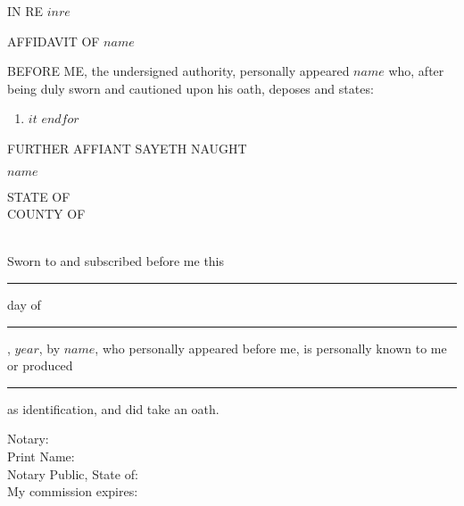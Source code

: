 \documentclass{article}
\def\name{{$name$\xspace}}
\begin{document}
\thispagestyle{empty}

\parbox{2in}{
  \MakeUppercase{In re $inre$}
  }

\begin{center}
  \MakeUppercase{\large Affidavit of \MakeUppercase{\name}}
\end{center}

\MakeUppercase{Before me}, the undersigned authority, personally appeared \MakeUppercase{\name} who, after being duly sworn and cautioned upon his oath, deposes and states:

\begin{enumerate}
  $for(statements)$
  \item $it$
  $endfor$
\end{enumerate}

\MakeUppercase{further affiant sayeth naught}\\

\begin{flushright}
\parbox{3in} {
  \hrulefill
  \vspace{-2ex}
  \begin{center}
    \MakeUppercase{\name}
  \end{center}
}
\end{flushright}

\parbox{2in} {
  \MakeUppercase{state of}\quad\hrulefill\\
  \MakeUppercase{county of}\quad\hrulefill
}

~\\

Sworn to and subscribed before me this \rule{0.25in}{0.4pt} day of \rule{0.5in}{0.4pt}, $year$, by \MakeUppercase{\name}, who personally appeared before me, is personally known to me or produced \rule{2in}{0.4pt} as identification, and did take an oath.

\vfill

\begin{flushright}
  \parbox{3in}{
    Notary:\quad\hrulefill\\
    Print Name:\quad\hrulefill\\
    Notary Public, State of:\quad\hrulefill\\
    My commission expires:\quad\hrulefill
  }
\end{flushright}
\end{document}
